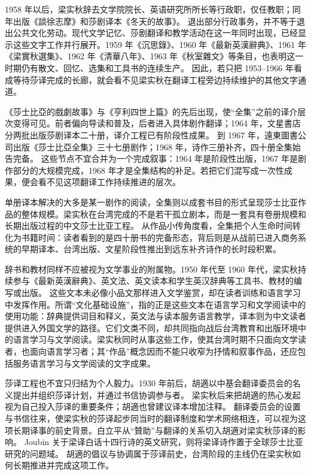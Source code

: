 \documentclass[UTF8,a4paper,zihao=-4,fontset=none]{ctexart}
\begin{document}
1958 年以后，梁实秋辞去文学院院长、英语研究所所长等行政职，仅任教职；同年出版《談徐志摩》和莎剧译本《冬天的故事》。\autocite{nmtl_liang_chronology} 退出部分行政事务，并不等于退出公共文化劳动。现代文学记忆、莎剧翻译和教学活动在这一年同时出现，已经显示这些文字工作并行展开。1959 年《沉思錄》、1960 年《最新英漢辭典》、1961 年《梁實秋選集》、1962 年《清華八年》、1963 年《秋室雜文》等条目，也表明这一时期仍有散文、回忆、选集和工具书的连续生产。\autocite{nmtl_liang_chronology} 因此，若只把 1953--1966 年看成等待莎译完成的长廊，就会看不见梁实秋在翻译工程旁边持续维护的其他文字通道。

《莎士比亞的戲劇故事》与《亨利四世上篇》的先后出现，使“全集”之前的译介层次变得可见。前者偏向导读和普及，后者进入具体剧作翻译；1964 年，文星書店分两批出版莎剧译本二十册，译介工程已有阶段性成果。\autocite{nmtl_liang_chronology,liang1974_on_translating_shakespeare} 到 1967 年，遠東圖書公司出版《莎士比亞全集》三十七册剧作；1968 年，诗作三册补齐，四十册全集始告完备。\autocite{nmtl_liang_chronology,shakespeare1968_liang_quanji,liang1974_on_translating_shakespeare} 这些节点不宜合并为一个完成叙事：1964 年是阶段性出版，1967 年是剧作部分的大规模完成，1968 年才是全集结构的补足。若把它们混写成一次性成果，便会看不见这项翻译工作持续推进的层次。

单册译本解决的大多是某一剧作的阅读，全集则以成套书目的形式呈现莎士比亚作品的整体规模。梁实秋在台湾完成的不是若干孤立剧本，而是一套具有卷册规模和长期出版过程的中文莎士比亚工程。\autocite{shakespeare1968_liang_quanji,nmtl_liang_chronology} 从作品小传角度看，全集把个人生命时间转化为书籍时间：读者看到的是四十册书的完备形态，背后则是从战前已进入商务系统的早期译本、台湾出版、文星阶段性推出到远东补齐诗作的长时段积累。\autocite{liang1974_on_translating_shakespeare,nmtl_liang_chronology,shakespeare1968_liang_quanji}

辞书和教材同样不应被视为文学事业的附属物。1950 年代至 1960 年代，梁实秋持续参与《最新英漢辭典》、英文法、英文读本和学生英汉辞典等工具书、教材的编写或出版。\autocite{nmtl_liang_chronology} 这些文本未必像小品文那样进入文学鉴赏，却在读者训练和语言学习中发挥作用。所谓“文化基础设施”，指的正是这些文本在语言学习和文学阅读中的使用功能：辞典提供词目和释义，英文法与读本服务语言教学，译本则为中文读者提供进入外国文学的路径。它们文类不同，却共同指向战后台湾教育和出版环境中的语言学习与文学阅读。梁实秋同时从事这些工作，使其台湾时期不只面向文学读者，也面向语言学习者；其“作品”概念因而不能只收窄为抒情和叙事作品，还应包括服务语言学习与文学阅读的文字成果。

莎译工程也不宜只归结为个人毅力。1930 年前后，胡適以中基会翻译委员会的名义提出并组织莎译计划，并通过书信协调参与者。\autocite{liang1974_on_translating_shakespeare} 梁实秋后来把胡適的热心发起视为自己投入莎译的重要条件；胡適也曾建议译本增加注释。\autocite{liang1974_on_translating_shakespeare} 翻译委员会的设置与书信往来，使梁实秋的莎译起步同当时的翻译制度和学术网络相连，可以视为这项长期译事的前史背景。白立平从“贊助”与翻译的关系切入胡適对梁实秋莎译的影响。\autocite{bai2001_patronage_translation} Joubin 关于梁译白话十四行诗的英文研究，则将梁译诗作置于全球莎士比亚研究的问题域。\autocite{joubin2023_liang_sonnets} 胡適的倡议与协调属于莎译前史，台湾阶段的主线仍在梁实秋如何长期推进并完成这项工作。
\end{document}
